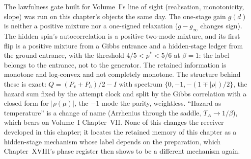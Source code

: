 The lawfulness gate built for Volume~I's line of sight (realisation, monotonicity, slope) was run on this chapter's objects the same day. The one-stage gain $g(d)$ is neither a positive mixture nor a one-signed relaxation ($g-g_\infty$ changes sign). The hidden spin's autocorrelation is a positive two-mode mixture, and its first flip is a positive mixture from a Gibbs entrance and a hidden-stage ledger from the ground entrance, with the threshold $4/5<p^\ast<5/6$ at $\beta=1$: the label belongs to the entrance, not to the generator. The retained information is monotone and log-convex and not completely monotone. The structure behind these is exact: $Q=(P_v+P_h)/2-I$ with spectrum $\{0,-1,-(1\mp|\rho|)/2\}$, the hazard sum fixed by the attempt clock and split by the Gibbs correlation with a closed form for $|\rho(\mu)|$, the $-1$ mode the parity, weightless. ``Hazard as temperature'' is a change of name (Arrhenius through the saddle, $T_A\to1/\beta$), which bears on Volume~I Chapter~VII. None of this changes the receiver developed in this chapter; it locates the retained memory of this chapter as a hidden-stage mechanism whose label depends on the preparation, which Chapter~XVIII's phase register then shows to be a different mechanism again.
